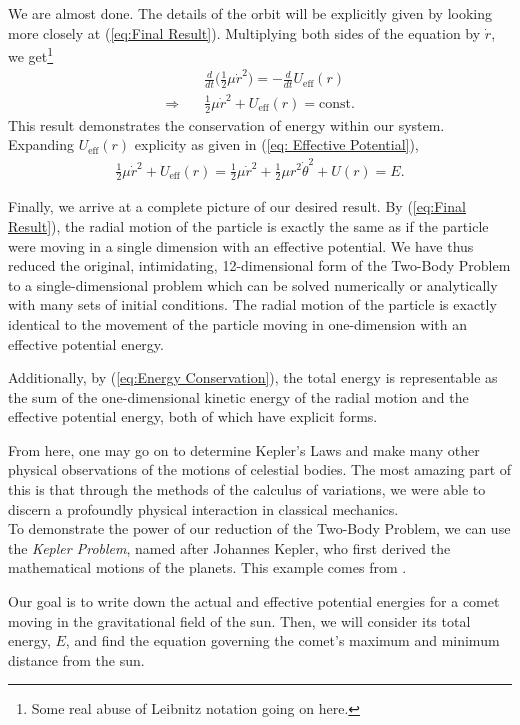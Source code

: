 \documentclass[10pt, psamsfonts]{amsart}
\theoremstyle{definition}
\theoremstyle{remark}
\numberwithin{equation}{section}
\begin{document}
We are almost done. The details of the orbit will be explicitly given by looking more closely at (\ref{eq:Final Result}). Multiplying both sides of the equation by $\dot{r}$, we get\footnote{Some real abuse of Leibnitz notation going on here.}
\begin{align*}
  & \frac{d}{dt} \bigg(\frac{1}{2} \mu \dot{r}^2 \bigg) = -\frac{d}{dt} U_{\text{eff}}(r)\\
  \Rightarrow \quad &  \frac{1}{2} \mu \dot{r}^2 + U_{\text{eff}}(r) = \text{const.}
\end{align*}
This result demonstrates the conservation of energy within our system. Expanding $U_{\text{eff}}(r) $ explicity as given in (\ref{eq: Effective Potential}),
\begin{gather}
    \label{eq:Energy Conservation}
  \frac{1}{2} \mu \dot{r}^2 + U_{\text{eff}}(r) = \frac{1}{2}  \mu \dot{r}^2 + \frac{1}{2} \mu r^2 \dot{\theta} ^2 + U(r)
  = E.
\end{gather}

Finally, we arrive at a complete picture of our desired result. By (\ref{eq:Final Result}), the radial motion of the particle is exactly the same as if the particle were moving in a single dimension with an effective potential. We have thus reduced the original, intimidating, 12-dimensional form of the Two-Body Problem to a single-dimensional problem which can be solved numerically or analytically with many sets of initial conditions. The radial motion of the particle is exactly identical to the movement of the particle moving in one-dimension with an effective potential energy. 

Additionally, by (\ref{eq:Energy Conservation}), the total energy is representable as the sum of the one-dimensional kinetic energy of the radial motion and the effective potential energy, both of which have explicit forms.

From here, one may go on to determine Kepler's Laws and make many other physical observations of the motions of celestial bodies. The most amazing part of this is that through the methods of the calculus of variations, we were able to discern a profoundly physical interaction in classical mechanics.\\

To demonstrate the power of our reduction of the Two-Body Problem, we can use the \textit{Kepler Problem}, named after Johannes Kepler, who first derived the mathematical motions of the planets. This example comes from \cite[Taylor]{3}. 

Our goal is to write down the actual and effective potential energies for a comet moving in the gravitational field of the sun. Then, we will consider its total energy, $E$, and find the equation governing the comet's maximum and minimum distance from the sun.
\end{document}
